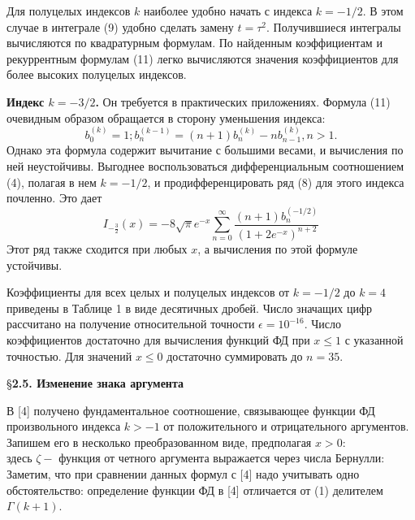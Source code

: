 Для полуцелых индексов $k$ наиболее удобно начать с индекса $k = -1/2$. В
этом случае в интеграле (9) удобно сделать замену $t = \tau^2$. Получившиеся
интегралы вычисляются по квадратурным формулам. По найденным
коэффициентам и рекуррентным формулам (11) легко вычисляются значения
коэффициентов для более высоких полуцелых индексов.

\textbf{Индекс $k = -3/2$.} Он требуется в практических приложениях. Формула
(11) очевидным образом обращается в сторону уменьшения индекса:
\begin{equation}
b_0^{(k)}=1;b_n^(k-1)=(n+1)b_n^{(k)}-nb_{n-1}^{(k)}, n > 1.
\end{equation}
Однако эта формула содержит вычитание с большими весами, и вычисления по
ней неустойчивы. Выгоднее воспользоваться дифференциальным
соотношением (4), полагая в нем $k = -1/2$, и продифференцировать ряд (8) для
этого индекса почленно. Это дает
\begin{equation}
I_{-\frac{3}{2}}(x)=-8\sqrt{\pi}e^{-x}\sum_{n=0}^{\infty} \frac{(n+1)b_n^{(-1/2)}}{(1+2e^{-x})^{n+2}}
\end{equation}
Этот ряд также сходится при любых $x$, а вычисления по этой формуле
устойчивы.

Коэффициенты для всех целых и полуцелых индексов от $k = -1/2$ до $k = 4$
приведены в Таблице 1 в виде десятичных дробей. Число значащих цифр
рассчитано на получение относительной точности $\epsilon = 10^{-16}$. Число
коэффициентов достаточно для вычисления функций ФД при $x \leqslant 1$ с указанной
точностью. Для значений $x \leqslant 0$ достаточно суммировать до $n = 35$.



\S \textbf{2.5. Изменение знака аргумента}

В [4] получено фундаментальное соотношение, связывающее функции ФД
произвольного индекса $k > -1$ от положительного и отрицательного
аргументов. Запишем его в несколько преобразованном виде, предполагая
$x > 0$:
\begin{equation}
\end{equation}
здесь $\zeta -$ функция от четного аргумента выражается через числа Бернулли:
\begin{equation}
\end{equation}
Заметим, что при сравнении данных формул с [4] надо учитывать одно
обстоятельство: определение функции ФД в [4] отличается от (1) делителем $\Gamma(k + 1)$.

